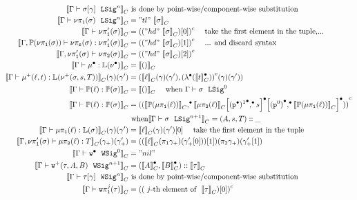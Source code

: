 \begin{align*}
  \denotesC{\goodSig{\Gm}{\sub{\lsig}{\gm}}{n}} & \text{ is done by point-wise/component-wise substitution} \\
  \denotesC{\goodSig{\Gm}{\lsigproj{1}{\lsig}}{n}} &= "tl"~\denotesC{\lsig}\\ 
  \denotesC{\goodType{\Gm}{\lsigprojT{\lsig}}{}} &= \Gmodel{("hd"~\denotesC{\lsig})[0]} \quad \text{ take the first element in the tuple,...}\\ 
  \denotesC{\goodTerm{\Gm, \TyTkg{\lsigproj{1}{\lsig}}}{\lsigproj{s}{\lsig}}{\lsigprojT{\lsig}}} &= \Gmodel{("hd"~\denotesC{\lsig})[1]} \quad \text{  ... and discard syntax}\\ 
  \denotesC{\goodType{\Gm, \lsigprojT{\lsig}}{\lsigproj{2}{\lsig}}{}} &= \Gmodel{("hd"~\denotesC{\lsig})[2]}\\
  \denotesC{\goodTerm{\Gm}{\LkgEmp}{\TyLkg{\LSigEmp}}} &= \denotesC{\unit} \\
  \denotesC{\goodTerm{\Gm}{\LkgAdd{\lkg}{t}}{\TyLkg{\LSigAdd{\lsig}{s}{T}}}}(\gm)(\gm') &= (\denotesC{\lkg}(\gm)(\gm') , \Gmodel{\Glam{\denotesCC{t}}}(\gm)(\gm')) \\
  \denotesC{\goodTerm{\Gm}{\Tkg{\lkg}}{\TyTkg{\lsig}}} &= \denotesC{\unit}
  \quad \text{ when \goodSig{\Gm}{\lsig}{0}} \\
  \denotesC{\goodTerm{\Gm}{\Tkg{\lkg}}{\TyTkg{\lsig}}} &= \Gmodel{\Gpair{\denotesC{\Tkg{\lkgproj{1}{\lkg}}}}{\Gsub{\Gsub{\denotesC{\lkgproj{2}{\lkg}}}{\GSubstExt{\Glued{\GSubstWeak{1}}}{s}}}{\GSubstExt{\Glued{(\SubstId)}}{\denotesC{\Tkg{\lkgproj{1}{\lkg}}}}}}}
  \\ &\text{ when} \denotesC{\goodSig{\Gm}{\lsig}{n+1}} = (A, s, T)::\_ \\
  \denotesC{\goodTerm{\Gm}{\lkgproj{1}{\lkg}}{\TyLkg{\lsig}}}(\gm)(\gm') &= \denotesC{\ell}(\gm)(\gm')[0] \quad \text{ take the first element in the tuple} \\
  \denotesC{\goodTerm{\Gm, \lsigprojT{\lsig}}{\lkgproj{2}{\lkg}}{T}}(\gm_+)(\gm_+') &= ((\denotesC{\ell}(\pi_1{\gm_+})(\gm_+'[0]))[1])(\pi_2{\gm_+})(\gm_+'[1]) \\
  \denotesC{\goodWSig{\Gm}{\WSigEmp}{0}} &= "nil" \\
  \denotesC{\goodWSig{\Gm}{\WSigAdd{\wsig}{A}{B}}{n+1}} &= (\denotesCC{A} , \denotesCC{B}) :: \denotesC{\wsig}\\
  \denotesC{\goodWSig{\Gm}{\sub{\wsig}{\gm}}{n}} & \text{ is done by point-wise/component-wise substitution} \\
  \denotesC{\goodType{\Gm}{\wsigproj{j}{1}{\wsig}}{}} &= \Gmodel{(\text{ $j$-th element of }~\denotesC{\wsig})[0]}\\

\end{align*}
